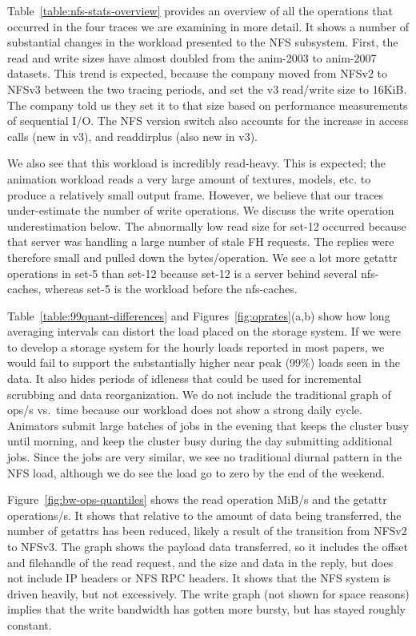 Table~\ref{table:nfs-stats-overview} provides an overview of all the
operations that occurred in the four traces we are examining in more
detail.  It shows a number of substantial changes in the workload
presented to the NFS subsystem.  First, the read and write sizes have
almost doubled from the anim-2003 to anim-2007 datasets.  This trend is expected,
because the company moved from NFSv2 to NFSv3 between the two
tracing periods, and set the v3 read/write size to 16KiB.  The company told
us they set it to that size based on performance
measurements of sequential I/O.  The NFS version switch also accounts
for the increase in access calls (new in v3), and readdirplus (also
new in v3).  

We also see that this workload is incredibly read-heavy.  This is
expected; the animation workload reads a very large amount of
textures, models, etc. to produce a relatively small output frame.
However, we believe that our traces under-estimate the number of write
operations.  We discuss the write operation underestimation below.
The abnormally low read size for set-12 occurred because
that server was handling a large number of stale FH requests.  The
replies were therefore small and pulled down the bytes/operation.  We
see a lot more getattr operations in set-5 than set-12 because set-12
is a server behind several nfs-caches, whereas set-5 is the workload
before the nfs-caches.

Table~\ref{table:99quant-differences} and
Figures~\ref{fig:oprates}(a,b) show how long averaging intervals can
distort the load placed on the storage system.  If we were to develop
a storage system for the hourly loads reported in most papers, we
would fail to support the substantially higher near peak (99\%) loads
seen in the data.  It also hides periods of idleness that could be
used for incremental scrubbing and data reorganization.  We do not
include the traditional graph of ops/s vs.\ time because our workload
does not show a strong daily cycle.  Animators submit large batches of
jobs in the evening that keeps the cluster busy until morning, and
keep the cluster busy during the day submitting additional jobs.
Since the jobs are very similar, we see no traditional diurnal pattern
in the NFS load, although we do see the load go to zero by the end of
the weekend.

Figure~\ref{fig:bw-ops-quantiles} shows the read operation MiB/s and
the getattr operations/s.  It shows that relative to the amount of
data being transferred, the number of getattrs has been reduced,
likely a result of the transition from NFSv2 to NFSv3.  The graph
shows the payload data transferred, so it includes the offset and
filehandle of the read request, and the size and data in the reply,
but does not include IP headers or NFS RPC headers.  It shows that the
NFS system is driven heavily, but not excessively. The write graph
(not shown for space reasons) implies that the write bandwidth has
gotten more bursty, but has stayed roughly constant.

